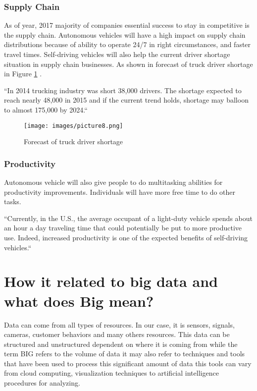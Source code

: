 \documentclass[sigconf]{acmart}
\begin{document}
\subsubsection{Supply Chain} As of year, 2017 majority of companies essential success to stay in competitive is the supply chain.  Autonomous vehicles will have a high impact on supply chain distributions because of ability to operate 24/7 in right circumstances, and faster travel times. Self-driving vehicles will also help the current driver shortage situation in supply chain businesses. As shown in forecast of truck driver shortage in Figure \ref{fig:small} \cite{ATA}.

    ``In 2014 trucking industry was short 38,000 drivers. The shortage expected to reach nearly 48,000 in 2015 and if the current trend holds, shortage may balloon to almost 175,000 by 2024\cite{ATA}.``

\begin{figure}[!ht]
  \centering
      \texttt{[image: images/picture8.png]}
  \caption{Forecast of truck driver shortage}\label{fig:small}
\end{figure}

\subsubsection{Productivity}Autonomous vehicle will also give people to do multitasking abilities for productivity improvements. Individuals will have more free time to do other tasks. 

``Currently, in the U.S., the average occupant of a light-duty vehicle spends about an hour a day traveling time that could potentially be put to more productive use. Indeed, increased productivity is one of the expected benefits of self-driving vehicles\cite{michigan}.``



\section{How it related to big data and what does Big mean?}
\par Data can come from all types of resources. In our case, it is sensors, signals, cameras, customer behaviors and many others resources. This data can be structured and unstructured dependent on where it is coming from while the term BIG refers to the volume of data it may also refer to techniques and tools that have been used to process this significant amount of data this tools can vary from cloud computing, visualization techniques to artificial intelligence procedures for analyzing\cite{www-webo}.
\end{document}
